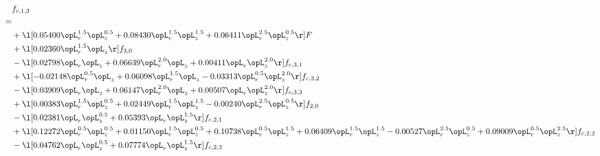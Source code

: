 \begin{alignat}{2} 
\label{eq:f_13_2} 
& f_{c,1,3} \nonumber \\ 
 = \\ 
& + \l[  0.05400 \opL_r^{1.5} \opL_z^{0.5} +  0.08430 \opL_r^{1.5} \opL_z^{1.5} +  0.06411 \opL_r^{2.5} \opL_z^{0.5}  \r] F \nonumber \\ 
& + \l[  0.02360 \opL_r^{1.5} \opL_z  \r] f_{3,0} \nonumber \\ 
& - \l[  0.02798 \opL_r \opL_z +  0.06639 \opL_r^{2.0} \opL_z +  0.00411 \opL_r \opL_z^{2.0}  \r] f_{c,3,1} \nonumber \\ 
& + \l[  -0.02148 \opL_r^{0.5} \opL_z +  0.06098 \opL_r^{1.5} \opL_z   -0.03313 \opL_r^{0.5} \opL_z^{2.0}  \r] f_{c,3,2} \nonumber \\ 
& - \l[  0.03909 \opL_r \opL_z +  0.06147 \opL_r^{2.0} \opL_z +  0.00507 \opL_r \opL_z^{2.0}  \r] f_{c,3,3} \nonumber \\ 
& + \l[  0.00383 \opL_r^{1.5} \opL_z^{0.5} +  0.02449 \opL_r^{1.5} \opL_z^{1.5}   -0.00240 \opL_r^{2.5} \opL_z^{0.5}  \r] f_{2,0} \nonumber \\ 
& - \l[  0.02381 \opL_r \opL_z^{0.5} +  0.05393 \opL_r \opL_z^{1.5}  \r] f_{c,2,1} \nonumber \\ 
& + \l[  0.12272 \opL_r^{0.5} \opL_z^{0.5} +  0.01150 \opL_r^{1.5} \opL_z^{0.5} +  0.10738 \opL_r^{0.5} \opL_z^{1.5} +  0.06409 \opL_r^{1.5} \opL_z^{1.5}   -0.00527 \opL_r^{2.5} \opL_z^{0.5} +  0.09009 \opL_r^{0.5} \opL_z^{2.5}  \r] f_{c,2,2} \nonumber \\ 
& - \l[  0.04762 \opL_r \opL_z^{0.5} +  0.07774 \opL_r \opL_z^{1.5}  \r] f_{c,2,3} \nonumber \\ 
\end{alignat} 


